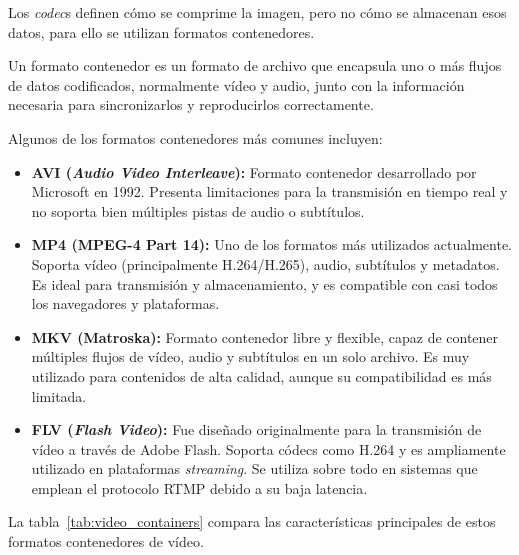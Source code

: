 Los \emph{codec}s definen cómo se comprime la imagen, pero no cómo se almacenan esos datos, para ello se utilizan formatos contenedores.

Un formato contenedor es un formato de archivo que encapsula uno o más flujos de datos codificados, normalmente vídeo y audio, junto con la información necesaria para sincronizarlos y reproducirlos correctamente.

Algunos de los formatos contenedores más comunes incluyen:

\begin{itemize}
    \item \textbf{AVI (\emph{Audio Video Interleave}):} Formato contenedor desarrollado por Microsoft en 1992.
    Presenta limitaciones para la transmisión en tiempo real y no soporta bien múltiples pistas de audio o subtítulos.

    \item \textbf{MP4 (MPEG-4 Part 14):} Uno de los formatos más utilizados actualmente.
    Soporta vídeo (principalmente H.264/H.265), audio, subtítulos y metadatos.
    Es ideal para transmisión y almacenamiento, y es compatible con casi todos los navegadores y plataformas.

    \item \textbf{MKV (Matroska):} Formato contenedor libre y flexible, capaz de contener múltiples flujos de vídeo, audio y subtítulos en un solo archivo.
    Es muy utilizado para contenidos de alta calidad, aunque su compatibilidad es más limitada.

    \item \textbf{FLV (\emph{Flash Video}):} Fue diseñado originalmente para la transmisión de vídeo a través de Adobe Flash.
    Soporta códecs como H.264 y es ampliamente utilizado en plataformas \emph{streaming}.
    Se utiliza sobre todo en sistemas que emplean el protocolo RTMP debido a su baja latencia.
\end{itemize}
La tabla~\ref{tab:video_containers} compara las características principales de estos formatos contenedores de vídeo.

